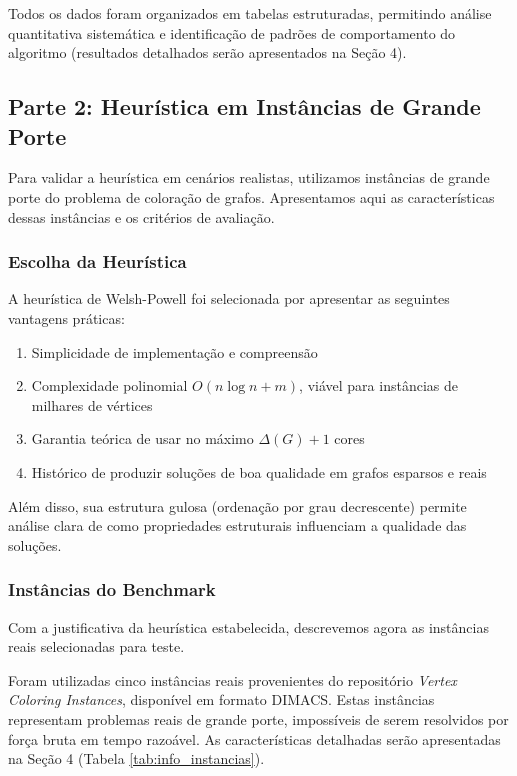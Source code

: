 \documentclass[12pt]{article}
\begin{document}
Todos os dados foram organizados em tabelas estruturadas, permitindo análise quantitativa sistemática e identificação de padrões de comportamento do algoritmo (resultados detalhados serão apresentados na Seção 4).

\subsection{Parte 2: Heurística em Instâncias de Grande Porte}

Para validar a heurística em cenários realistas, utilizamos instâncias de grande porte do problema de coloração de grafos. Apresentamos aqui as características dessas instâncias e os critérios de avaliação.

\subsubsection{Escolha da Heurística}

A heurística de Welsh-Powell foi selecionada por apresentar as seguintes vantagens práticas:

\begin{enumerate}
    \item Simplicidade de implementação e compreensão
    \item Complexidade polinomial $O(n \log n + m)$, viável para instâncias de milhares de vértices
    \item Garantia teórica de usar no máximo $\Delta(G) + 1$ cores
    \item Histórico de produzir soluções de boa qualidade em grafos esparsos e reais
\end{enumerate}

Além disso, sua estrutura gulosa (ordenação por grau decrescente) permite análise clara de como propriedades estruturais influenciam a qualidade das soluções.

\subsubsection{Instâncias do Benchmark}

Com a justificativa da heurística estabelecida, descrevemos agora as instâncias reais selecionadas para teste.

Foram utilizadas cinco instâncias reais provenientes do repositório \textit{Vertex Coloring Instances}, disponível em formato DIMACS. Estas instâncias representam problemas reais de grande porte, impossíveis de serem resolvidos por força bruta em tempo razoável. As características detalhadas serão apresentadas na Seção 4 (Tabela \ref{tab:info_instancias}).
\end{document}
